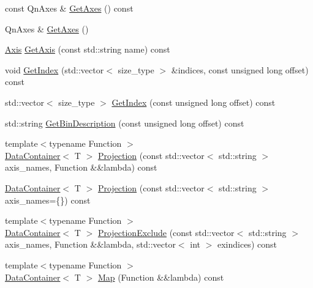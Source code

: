 \begin{DoxyCompactItemize}
\item 
const Qn\+Axes \& \mbox{\hyperlink{classQn_1_1DataContainer_a8c603692b39277e0cfbaa83c69c31336}{Get\+Axes}} () const
\item 
Qn\+Axes \& \mbox{\hyperlink{classQn_1_1DataContainer_acf5507cd4e2b1cb26b58b176b9a7cde3}{Get\+Axes}} ()
\item 
\mbox{\hyperlink{classQn_1_1Axis}{Axis}} \mbox{\hyperlink{classQn_1_1DataContainer_a1fdc10d4a7feb391aa7291900c9e2073}{Get\+Axis}} (const std\+::string name) const
\item 
void \mbox{\hyperlink{classQn_1_1DataContainer_ac4cb2d0af4e28966603b97dc50e5ce50}{Get\+Index}} (std\+::vector$<$ size\+\_\+type $>$ \&indices, const unsigned long offset) const
\item 
std\+::vector$<$ size\+\_\+type $>$ \mbox{\hyperlink{classQn_1_1DataContainer_aa9b5b94b254a2e447b843b3bed6a9b92}{Get\+Index}} (const unsigned long offset) const
\item 
std\+::string \mbox{\hyperlink{classQn_1_1DataContainer_a50ede53a78fd13dfa1cf4bad0b04babc}{Get\+Bin\+Description}} (const unsigned long offset) const
\item 
{\footnotesize template$<$typename Function $>$ }\\\mbox{\hyperlink{classQn_1_1DataContainer}{Data\+Container}}$<$ T $>$ \mbox{\hyperlink{classQn_1_1DataContainer_ac20e9292be55e0241647f356c1d7bb4e}{Projection}} (const std\+::vector$<$ std\+::string $>$ axis\+\_\+names, Function \&\&lambda) const
\item 
\mbox{\hyperlink{classQn_1_1DataContainer}{Data\+Container}}$<$ T $>$ \mbox{\hyperlink{classQn_1_1DataContainer_a0f0c2dbb7e48d706ca19d45fa32f99f4}{Projection}} (const std\+::vector$<$ std\+::string $>$ axis\+\_\+names=\{\}) const
\item 
{\footnotesize template$<$typename Function $>$ }\\\mbox{\hyperlink{classQn_1_1DataContainer}{Data\+Container}}$<$ T $>$ \mbox{\hyperlink{classQn_1_1DataContainer_a40c7b7ffaa61bbf616006b2fa95f6d5f}{Projection\+Exclude}} (const std\+::vector$<$ std\+::string $>$ axis\+\_\+names, Function \&\&lambda, std\+::vector$<$ int $>$ exindices) const
\item 
{\footnotesize template$<$typename Function $>$ }\\\mbox{\hyperlink{classQn_1_1DataContainer}{Data\+Container}}$<$ T $>$ \mbox{\hyperlink{classQn_1_1DataContainer_a270d35d401e506983516dbd00728232d}{Map}} (Function \&\&lambda) const
\item 

\end{DoxyCompactItemize}
